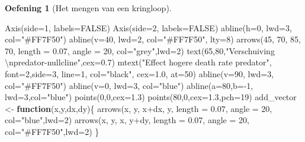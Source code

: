\documentclass[
  a4paper,
]{scrbook}
\newenvironment{Shaded}{\begin{snugshade}}{\end{snugshade}}
\newcommand{\AttributeTok}[1]{\textcolor[rgb]{0.40,0.45,0.13}{#1}}
\newcommand{\ConstantTok}[1]{\textcolor[rgb]{0.56,0.35,0.01}{#1}}
\newcommand{\ControlFlowTok}[1]{\textcolor[rgb]{0.00,0.23,0.31}{\textbf{#1}}}
\newcommand{\DecValTok}[1]{\textcolor[rgb]{0.68,0.00,0.00}{#1}}
\newcommand{\FloatTok}[1]{\textcolor[rgb]{0.68,0.00,0.00}{#1}}
\newcommand{\FunctionTok}[1]{\textcolor[rgb]{0.28,0.35,0.67}{#1}}
\newcommand{\NormalTok}[1]{\textcolor[rgb]{0.00,0.23,0.31}{#1}}
\newcommand{\OtherTok}[1]{\textcolor[rgb]{0.00,0.23,0.31}{#1}}
\newcommand{\SpecialCharTok}[1]{\textcolor[rgb]{0.37,0.37,0.37}{#1}}
\newcommand{\StringTok}[1]{\textcolor[rgb]{0.13,0.47,0.30}{#1}}
\theoremstyle{definition}
\newtheorem{exercise}{Oefening}[chapter]
\theoremstyle{remark}
\begin{document}
\begin{exercise}[Het mengen van een
kringloop]
\begin{Shaded}
\begin{Highlighting}[]
\FunctionTok{Axis}\NormalTok{(}\AttributeTok{side=}\DecValTok{1}\NormalTok{, }\AttributeTok{labels=}\ConstantTok{FALSE}\NormalTok{)}
\FunctionTok{Axis}\NormalTok{(}\AttributeTok{side=}\DecValTok{2}\NormalTok{, }\AttributeTok{labels=}\ConstantTok{FALSE}\NormalTok{)}
\FunctionTok{abline}\NormalTok{(}\AttributeTok{h=}\DecValTok{0}\NormalTok{, }\AttributeTok{lwd=}\DecValTok{3}\NormalTok{, }\AttributeTok{col=}\StringTok{"\#FF7F50"}\NormalTok{)}
\FunctionTok{abline}\NormalTok{(}\AttributeTok{v=}\DecValTok{40}\NormalTok{, }\AttributeTok{lwd=}\DecValTok{2}\NormalTok{, }\AttributeTok{col=}\StringTok{"\#FF7F50"}\NormalTok{, }\AttributeTok{lty=}\DecValTok{8}\NormalTok{)}
\FunctionTok{arrows}\NormalTok{(}\DecValTok{45}\NormalTok{, }\DecValTok{70}\NormalTok{, }\DecValTok{85}\NormalTok{, }\DecValTok{70}\NormalTok{, }\AttributeTok{length =} \FloatTok{0.07}\NormalTok{, }\AttributeTok{angle =} \DecValTok{20}\NormalTok{, }\AttributeTok{col=}\StringTok{"grey"}\NormalTok{,}\AttributeTok{lwd=}\DecValTok{2}\NormalTok{)}
\FunctionTok{text}\NormalTok{(}\DecValTok{65}\NormalTok{,}\DecValTok{80}\NormalTok{,}\StringTok{"Verschuiving }\SpecialCharTok{\textbackslash{}n}\StringTok{predator{-}nullcline"}\NormalTok{,}\AttributeTok{cex=}\FloatTok{0.7}\NormalTok{)}
\FunctionTok{mtext}\NormalTok{(}\StringTok{"Effect hogere death rate predator"}\NormalTok{, }\AttributeTok{font=}\DecValTok{2}\NormalTok{,}\AttributeTok{side=}\DecValTok{3}\NormalTok{, }\AttributeTok{line=}\DecValTok{1}\NormalTok{, }\AttributeTok{col=}\StringTok{"black"}\NormalTok{, }\AttributeTok{cex=}\FloatTok{1.0}\NormalTok{, }\AttributeTok{at=}\DecValTok{50}\NormalTok{)}
\FunctionTok{abline}\NormalTok{(}\AttributeTok{v=}\DecValTok{90}\NormalTok{, }\AttributeTok{lwd=}\DecValTok{3}\NormalTok{, }\AttributeTok{col=}\StringTok{"\#FF7F50"}\NormalTok{)}
\FunctionTok{abline}\NormalTok{(}\AttributeTok{v=}\DecValTok{0}\NormalTok{, }\AttributeTok{lwd=}\DecValTok{3}\NormalTok{, }\AttributeTok{col=}\StringTok{"blue"}\NormalTok{)}
\FunctionTok{abline}\NormalTok{(}\AttributeTok{a=}\DecValTok{80}\NormalTok{,}\AttributeTok{b=}\SpecialCharTok{{-}}\DecValTok{1}\NormalTok{, }\AttributeTok{lwd=}\DecValTok{3}\NormalTok{,}\AttributeTok{col=}\StringTok{"blue"}\NormalTok{)}
\FunctionTok{points}\NormalTok{(}\DecValTok{0}\NormalTok{,}\DecValTok{0}\NormalTok{,}\AttributeTok{cex=}\FloatTok{1.3}\NormalTok{)}
\FunctionTok{points}\NormalTok{(}\DecValTok{80}\NormalTok{,}\DecValTok{0}\NormalTok{,}\AttributeTok{cex=}\FloatTok{1.3}\NormalTok{,}\AttributeTok{pch=}\DecValTok{19}\NormalTok{)}
\NormalTok{add\_vector }\OtherTok{\textless{}{-}} \ControlFlowTok{function}\NormalTok{(x,y,dx,dy)\{}
  \FunctionTok{arrows}\NormalTok{(x, y, x}\SpecialCharTok{+}\NormalTok{dx, y, }\AttributeTok{length =} \FloatTok{0.07}\NormalTok{, }\AttributeTok{angle =} \DecValTok{20}\NormalTok{, }\AttributeTok{col=}\StringTok{"blue"}\NormalTok{,}\AttributeTok{lwd=}\DecValTok{2}\NormalTok{)}
  \FunctionTok{arrows}\NormalTok{(x, y, x, y}\SpecialCharTok{+}\NormalTok{dy, }\AttributeTok{length =} \FloatTok{0.07}\NormalTok{, }\AttributeTok{angle =} \DecValTok{20}\NormalTok{, }\AttributeTok{col=}\StringTok{"\#FF7F50"}\NormalTok{,}\AttributeTok{lwd=}\DecValTok{2}\NormalTok{)}
\NormalTok{\}}


\end{Highlighting}
\end{Shaded}
\end{exercise}
\end{document}
